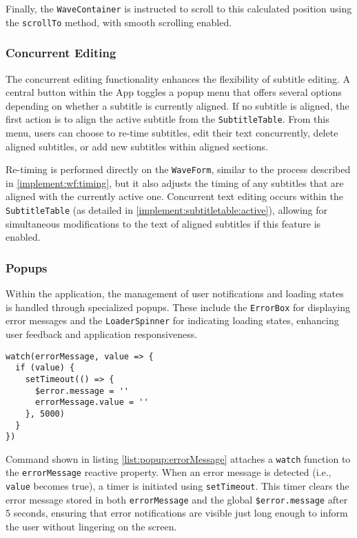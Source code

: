 Finally, the \texttt{WaveContainer} is instructed to scroll to this calculated position using the \texttt{scrollTo} method, with smooth scrolling enabled.

\subsubsection{Concurrent Editing}

The concurrent editing functionality enhances the flexibility of subtitle editing. A central button within the App toggles a popup menu that offers several options depending on whether a subtitle is currently aligned. If no subtitle is aligned, the first action is to align the active subtitle from the \texttt{SubtitleTable}. From this menu, users can choose to re-time subtitles, edit their text concurrently, delete aligned subtitles, or add new subtitles within aligned sections.

Re-timing is performed directly on the \texttt{WaveForm}, similar to the process described in \ref{implement:wf:timing}, but it also adjusts the timing of any subtitles that are aligned with the currently active one. Concurrent text editing occurs within the \texttt{SubtitleTable} (as detailed in \ref{implement:subtitletable:active}), allowing for simultaneous modifications to the text of aligned subtitles if this feature is enabled.

\subsubsection{Popups}

Within the application, the management of user notifications and loading states is handled through specialized popups. These include the \texttt{ErrorBox} for displaying error messages and the \texttt{LoaderSpinner} for indicating loading states, enhancing user feedback and application responsiveness.

\begin{clisting}
\label{list:popup:errorMessage}
\begin{verbatim}
watch(errorMessage, value => {
  if (value) {
    setTimeout(() => {
      $error.message = ''
      errorMessage.value = ''
    }, 5000)
  }
})
\end{verbatim}
\end{clisting}

\noindent Command shown in listing \ref{list:popup:errorMessage} attaches a \texttt{watch} function to the \texttt{errorMessage} reactive property. When an error message is detected (i.e., \texttt{value} becomes true), a timer is initiated using \texttt{setTimeout}. This timer clears the error message stored in both \texttt{errorMessage} and the global \texttt{\$error.message} after 5 seconds, ensuring that error notifications are visible just long enough to inform the user without lingering on the screen.

